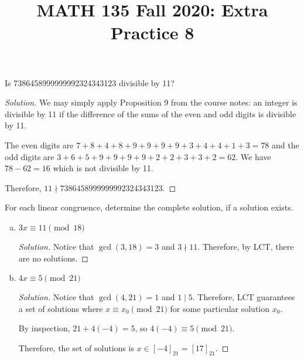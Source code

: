 \documentclass{agony}
\title{MATH 135 Fall 2020: Extra Practice 8}
\begin{document}
\thispagestyle{firstpage}

\textbf{\thetitle}


\question Is 7386458999999992324343123 divisible by 11?
\begin{proof}[Solution]
  We may simply apply Proposition 9 from the course notes: an integer is divisible by 11
  if the difference of the sums of the even and odd digits is divisible by 11.

  The even digits are $7+8+4+8+9+9+9+9+3+4+4+1+3 = 78$
  and the odd digits are $3+6+5+9+9+9+9+2+2+3+3+2 = 62$.
  We have $78 - 62 = 16$ which is not divisible by 11.

  Therefore, $11 \nmid 7386458999999992324343123$.
\end{proof}


\question For each linear congruence, determine the complete solution, if a solution exists.
\begin{enumerate}[(a)]
  \item $3x \equiv 11 \pmod{18}$
        \begin{proof}[Solution]
          Notice that $\gcd(3,18)=3$ and $3 \nmid 11$.
          Therefore, by LCT, there are no solutions.
        \end{proof}
  \item $4x \equiv 5 \pmod{21}$
        \begin{proof}[Solution]
          Notice that $\gcd(4,21)=1$ and $1 \mid 5$.
          Therefore, LCT guarantees a set of solutions where $x \equiv x_0 \pmod{21}$
          for some particular solution $x_0$.

          By inspection, $21+4(-4) = 5$, so $4(-4) \equiv 5 \pmod{21}$.

          Therefore, the set of solutions is $x \in [-4]_{21} = [17]_{21}$.
        \end{proof}
\end{enumerate}
\end{document}
